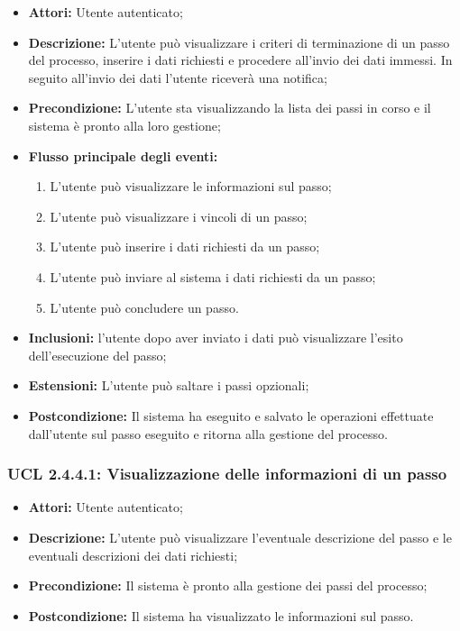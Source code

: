 \begin{itemize}
\item \textbf{Attori:} Utente autenticato;
\item \textbf{Descrizione:} L'utente può visualizzare i criteri di terminazione di un passo del processo, inserire i dati richiesti e procedere all'invio dei dati immessi. In seguito all'invio dei dati l'utente riceverà una notifica;
\item \textbf{Precondizione:} L'utente sta visualizzando la lista dei passi in corso e il sistema è pronto alla loro gestione;
\item \textbf{Flusso principale degli eventi:}
\begin{enumerate}
\item L'utente può visualizzare le informazioni sul passo;
\item L'utente può visualizzare i vincoli di un passo;
\item L'utente può inserire i dati richiesti da un passo;
\item L'utente può inviare al sistema i dati richiesti da un passo;
\item L'utente può concludere un passo.
\end{enumerate}
\item \textbf{Inclusioni:} l'utente dopo aver inviato i dati può visualizzare l'esito dell'esecuzione del passo;
\item \textbf{Estensioni:} L'utente può saltare i passi opzionali;
\item \textbf{Postcondizione:} Il sistema ha eseguito e salvato le operazioni effettuate dall'utente sul passo eseguito e ritorna alla gestione del processo.
\end{itemize}

\hypertarget{L2.4.4.1}{}
\subsubsection{UCL 2.4.4.1: Visualizzazione delle informazioni di un passo}
\begin{itemize}
\item \textbf{Attori:} Utente autenticato;
\item \textbf{Descrizione:} L'utente può visualizzare l'eventuale descrizione del passo e le eventuali descrizioni dei dati richiesti;
\item \textbf{Precondizione:} Il sistema è pronto alla gestione dei passi del processo;
\item \textbf{Postcondizione:} Il sistema ha visualizzato le informazioni sul passo.
\end{itemize}


